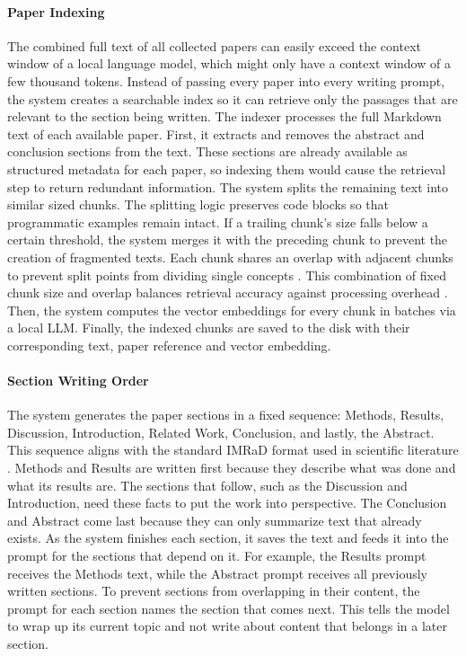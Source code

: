 \paragraph{Paper Indexing}
The combined full text of all collected papers can easily exceed the context window of a local language model, which might only have a context window of a few thousand tokens.
Instead of passing every paper into every writing prompt, the system creates a searchable index so it can retrieve only the passages that are relevant to the section being written.
The indexer processes the full Markdown text of each available paper.
First, it extracts and removes the abstract and conclusion sections from the text.
These sections are already available as structured metadata for each paper, so indexing them would cause the retrieval step to return redundant information.
The system splits the remaining text into similar sized chunks.
The splitting logic preserves code blocks so that programmatic examples remain intact.
If a trailing chunk's size falls below a certain threshold, the system merges it with the preceding chunk to prevent the creation of fragmented texts.
Each chunk shares an overlap with adjacent chunks to prevent split points from dividing single concepts \cite{Wampler2025}.
This combination of fixed chunk size and overlap balances retrieval accuracy against processing overhead \cite{Merola2025}.
Then, the system computes the vector embeddings for every chunk in batches via a local LLM.
Finally, the indexed chunks are saved to the disk with their corresponding text, paper reference and vector embedding.

\paragraph{Section Writing Order}
The system generates the paper sections in a fixed sequence: Methods, Results, Discussion, Introduction, Related Work, Conclusion, and lastly, the Abstract.
This sequence aligns with the standard IMRaD format used in scientific literature \cite{Sollaci2004}.
Methods and Results are written first because they describe what was done and what its results are.
The sections that follow, such as the Discussion and Introduction, need these facts to put the work into perspective.
The Conclusion and Abstract come last because they can only summarize text that already exists.
As the system finishes each section, it saves the text and feeds it into the prompt for the sections that depend on it.
For example, the Results prompt receives the Methods text, while the Abstract prompt receives all previously written sections.
To prevent sections from overlapping in their content, the prompt for each section names the section that comes next.
This tells the model to wrap up its current topic and not write about content that belongs in a later section.

